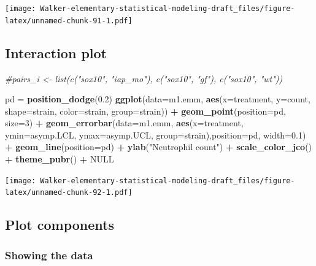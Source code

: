 \documentclass[]{book}
\newenvironment{Shaded}{\begin{snugshade}}{\end{snugshade}}
\newcommand{\CommentTok}[1]{\textcolor[rgb]{0.56,0.35,0.01}{\textit{#1}}}
\newcommand{\DataTypeTok}[1]{\textcolor[rgb]{0.13,0.29,0.53}{#1}}
\newcommand{\DecValTok}[1]{\textcolor[rgb]{0.00,0.00,0.81}{#1}}
\newcommand{\FloatTok}[1]{\textcolor[rgb]{0.00,0.00,0.81}{#1}}
\newcommand{\KeywordTok}[1]{\textcolor[rgb]{0.13,0.29,0.53}{\textbf{#1}}}
\newcommand{\NormalTok}[1]{#1}
\newcommand{\OperatorTok}[1]{\textcolor[rgb]{0.81,0.36,0.00}{\textbf{#1}}}
\newcommand{\OtherTok}[1]{\textcolor[rgb]{0.56,0.35,0.01}{#1}}
\newcommand{\StringTok}[1]{\textcolor[rgb]{0.31,0.60,0.02}{#1}}
\begin{document}
\texttt{[image: Walker-elementary-statistical-modeling-draft\_files/figure-latex/unnamed-chunk-91-1.pdf]}

\hypertarget{interaction-plot}{%
\subsection{Interaction plot}\label{interaction-plot}}

\begin{Shaded}
\begin{Highlighting}[]
\CommentTok{#pairs_i <- list(c("sox10", "iap_mo"), c("sox10", "gf"), c("sox10", "wt"))}

\NormalTok{pd =}\StringTok{ }\KeywordTok{position_dodge}\NormalTok{(}\FloatTok{0.2}\NormalTok{)}
\KeywordTok{ggplot}\NormalTok{(}\DataTypeTok{data=}\NormalTok{m1.emm, }\KeywordTok{aes}\NormalTok{(}\DataTypeTok{x=}\NormalTok{treatment, }\DataTypeTok{y=}\NormalTok{count, }\DataTypeTok{shape=}\NormalTok{strain, }\DataTypeTok{color=}\NormalTok{strain, }\DataTypeTok{group=}\NormalTok{strain)) }\OperatorTok{+}
\StringTok{  }\KeywordTok{geom_point}\NormalTok{(}\DataTypeTok{position=}\NormalTok{pd, }\DataTypeTok{size=}\DecValTok{3}\NormalTok{) }\OperatorTok{+}
\StringTok{  }\KeywordTok{geom_errorbar}\NormalTok{(}\DataTypeTok{data=}\NormalTok{m1.emm, }\KeywordTok{aes}\NormalTok{(}\DataTypeTok{x=}\NormalTok{treatment, }\DataTypeTok{ymin=}\NormalTok{asymp.LCL, }\DataTypeTok{ymax=}\NormalTok{asymp.UCL, }\DataTypeTok{group=}\NormalTok{strain),}\DataTypeTok{position=}\NormalTok{pd, }\DataTypeTok{width=}\FloatTok{0.1}\NormalTok{) }\OperatorTok{+}
\StringTok{  }\KeywordTok{geom_line}\NormalTok{(}\DataTypeTok{position=}\NormalTok{pd) }\OperatorTok{+}
\StringTok{  }\KeywordTok{ylab}\NormalTok{(}\StringTok{"Neutrophil count"}\NormalTok{) }\OperatorTok{+}
\StringTok{  }\KeywordTok{scale_color_jco}\NormalTok{() }\OperatorTok{+}
\StringTok{  }\KeywordTok{theme_pubr}\NormalTok{() }\OperatorTok{+}
\StringTok{  }\OtherTok{NULL}
\end{Highlighting}
\end{Shaded}

\texttt{[image: Walker-elementary-statistical-modeling-draft\_files/figure-latex/unnamed-chunk-92-1.pdf]}

\hypertarget{plot-components}{%
\subsection{Plot components}\label{plot-components}}

\hypertarget{showing-the-data}{%
\subsubsection{Showing the data}\label{showing-the-data}}
\end{document}
